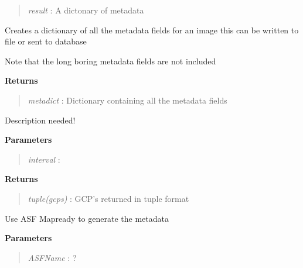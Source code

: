 \documentclass[letterpaper,10pt,english]{sphinxmanual}
\begin{document}
\begin{fulllineitems}
\begin{fulllineitems}
\begin{quote}
\emph{result} : A dictonary of metadata
\end{quote}

\end{fulllineitems}


\begin{fulllineitems}
\label{code:Metadata.Metadata.createMetaDict}
Creates a dictionary of all the metadata fields for an image
this can be written to file or sent to database

Note that the long boring metadata fields are not included

\textbf{Returns}
\begin{quote}

\emph{metadict} : Dictionary containing all the metadata fields
\end{quote}

\end{fulllineitems}


\begin{fulllineitems}
\label{code:Metadata.Metadata.extractGCPs}
Description needed!

\textbf{Parameters}
\begin{quote}

\emph{interval}    :
\end{quote}

\textbf{Returns}
\begin{quote}

\emph{tuple(gcps)} : GCP's returned in tuple format
\end{quote}

\end{fulllineitems}


\begin{fulllineitems}
\label{code:Metadata.Metadata.getASFMetaCorners}
Use ASF Mapready to generate the metadata

\textbf{Parameters}
\begin{quote}

\emph{ASFName} : ?
\end{quote}


\end{fulllineitems}
\end{fulllineitems}
\end{document}
